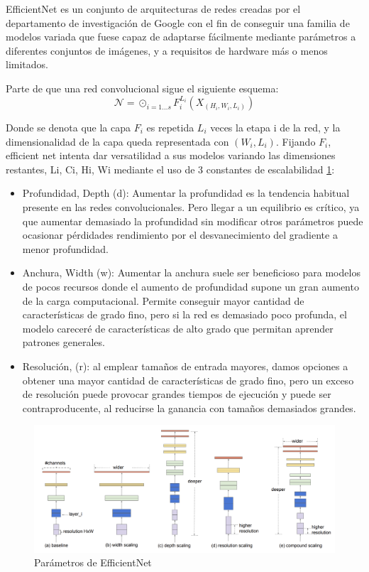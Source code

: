EfficientNet \cite{Chaturvedi_2020} es un conjunto de arquitecturas de redes creadas por el departamento de investigación de Google con el fin de conseguir una familia de modelos variada que fuese capaz de adaptarse fácilmente mediante parámetros a diferentes conjuntos de imágenes, y a requisitos de hardware más o menos limitados. 

Parte de que una red convolucional sigue el siguiente esquema:
$$\mathcal{N}=\odot_{i=1...s} F_i^{L_i}(X_{(H_i, W_i,L_i)})$$


Donde se denota que la capa $F_i$ es repetida $L_i$ veces la etapa i de la red, y la dimensionalidad de la capa queda representada con ${( W_i,L_i)}$.  Fijando $F_i$, efficient net intenta dar versatilidad a sus modelos variando las dimensiones restantes, Li, Ci, Hi, Wi mediante el uso de 3 constantes de escalabilidad \ref{fig:paramsefnet}:

\begin{itemize}
	 \item  Profundidad, Depth (d):  Aumentar la profundidad es la tendencia habitual presente en las redes convolucionales. Pero llegar a un equilibrio es crítico, ya que aumentar demasiado la profundidad sin modificar otros parámetros puede ocasionar pérdidades rendimiento por el desvanecimiento del gradiente  a menor profundidad. 
	\item Anchura, Width (w): Aumentar la anchura suele ser beneficioso para modelos de pocos recursos donde el aumento de profundidad supone un gran aumento de la carga computacional. Permite conseguir mayor cantidad de características de grado fino, pero si la red es demasiado poco profunda, el modelo careceré de características de alto grado que permitan aprender patrones generales.
	\item Resolución, (r): al emplear tamaños de entrada mayores, damos opciones a obtener una mayor cantidad de características de grado fino, pero un exceso de resolución puede provocar grandes tiempos de ejecución y puede ser contraproducente, al reducirse la ganancia con tamaños demasiados grandes.
\end{itemize}

\begin{figure}[H]
	\centering
	\includegraphics[scale = 0.2]{imagenes/efnet_scale.png}
	\caption{Parámetros de EfficientNet}
	\label{fig:paramsefnet}
\end{figure}


